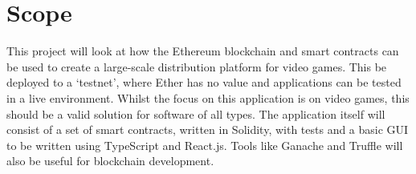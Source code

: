\section{Scope}

This project will look at how the Ethereum blockchain and smart contracts can be used to create a large-scale distribution platform for video games. This be deployed to a `testnet', where Ether has no value and applications can be tested in a live environment. Whilst the focus on this application is on video games, this should be a valid solution for software of all types.
\x
The application itself will consist of a set of smart contracts, written in Solidity, with tests and a basic GUI to be written using TypeScript and React.js. Tools like Ganache and Truffle will also be useful for blockchain development.  